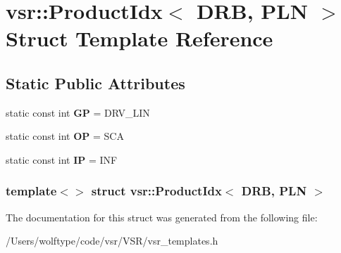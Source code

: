 \hypertarget{structvsr_1_1_product_idx_3_01_d_r_b_00_01_p_l_n_01_4}{\section{vsr\-:\-:Product\-Idx$<$ D\-R\-B, P\-L\-N $>$ Struct Template Reference}
\label{structvsr_1_1_product_idx_3_01_d_r_b_00_01_p_l_n_01_4}
}
\subsection*{Static Public Attributes}
\begin{DoxyCompactItemize}
\item 
\hypertarget{structvsr_1_1_product_idx_3_01_d_r_b_00_01_p_l_n_01_4_a36c8f4b18c230b2dce74dfd97339c2d4}{static const int {\bfseries G\-P} = D\-R\-V\-\_\-\-L\-I\-N}\label{structvsr_1_1_product_idx_3_01_d_r_b_00_01_p_l_n_01_4_a36c8f4b18c230b2dce74dfd97339c2d4}

\item 
\hypertarget{structvsr_1_1_product_idx_3_01_d_r_b_00_01_p_l_n_01_4_ad164a6f4ef4296ffa98f64356f382e4b}{static const int {\bfseries O\-P} = S\-C\-A}\label{structvsr_1_1_product_idx_3_01_d_r_b_00_01_p_l_n_01_4_ad164a6f4ef4296ffa98f64356f382e4b}

\item 
\hypertarget{structvsr_1_1_product_idx_3_01_d_r_b_00_01_p_l_n_01_4_aad1a0f8fdbe17948b7b8e5e63326e8ea}{static const int {\bfseries I\-P} = I\-N\-F}\label{structvsr_1_1_product_idx_3_01_d_r_b_00_01_p_l_n_01_4_aad1a0f8fdbe17948b7b8e5e63326e8ea}

\end{DoxyCompactItemize}
\subsubsection*{template$<$$>$ struct vsr\-::\-Product\-Idx$<$ D\-R\-B, P\-L\-N $>$}



The documentation for this struct was generated from the following file\-:\begin{DoxyCompactItemize}
\item 
/\-Users/wolftype/code/vsr/\-V\-S\-R/vsr\-\_\-templates.\-h\end{DoxyCompactItemize}
